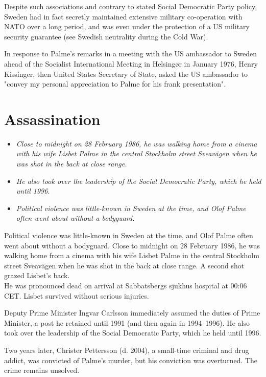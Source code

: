 Despite such associations and contrary to stated Social Democratic Party
policy, Sweden had in fact secretly maintained extensive military
co-operation with NATO over a long period, and was even under the
protection of a US military security guarantee (see Swedish neutrality
during the Cold War).

In response to Palme's remarks in a meeting with the US ambassador to
Sweden ahead of the Socialist International Meeting in Helsingør in
January 1976, Henry Kissinger, then United States Secretary of State,
asked the US ambassador to "convey my personal appreciation to Palme for
his frank presentation".

\section{Assassination}\label{assassination}

\begin{itemize}
\item
  \emph{Close to midnight on 28 February 1986, he was walking home from
  a cinema with his wife Lisbet Palme in the central Stockholm street
  Sveavägen when he was shot in the back at close range.}
\item
  \emph{He also took over the leadership of the Social Democratic Party,
  which he held until 1996.}
\item
  \emph{Political violence was little-known in Sweden at the time, and
  Olof Palme often went about without a bodyguard.}
\end{itemize}

Political violence was little-known in Sweden at the time, and Olof
Palme often went about without a bodyguard. Close to midnight on 28
February 1986, he was walking home from a cinema with his wife Lisbet
Palme in the central Stockholm street Sveavägen when he was shot in the
back at close range. A second shot grazed Lisbet's back.\\
He was pronounced dead on arrival at Sabbatsbergs sjukhus hospital at
00:06 CET. Lisbet survived without serious injuries.

Deputy Prime Minister Ingvar Carlsson immediately assumed the duties of
Prime Minister, a post he retained until 1991 (and then again in
1994--1996). He also took over the leadership of the Social Democratic
Party, which he held until 1996.

Two years later, Christer Pettersson (d. 2004), a small-time criminal
and drug addict, was convicted of Palme's murder, but his conviction was
overturned. The crime remains unsolved.

